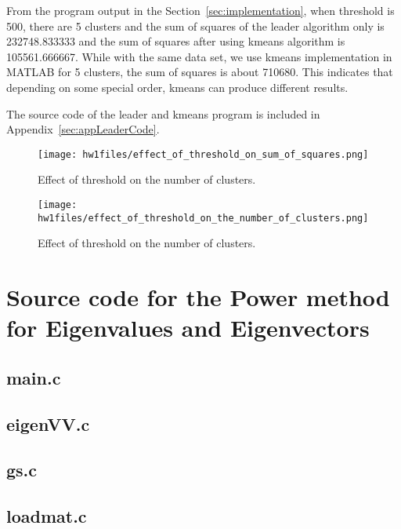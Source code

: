 \documentclass{article}
\begin{document}
From the program output in the Section~\ref{sec:implementation}, when threshold
is 500, there are 5 clusters and the sum of squares of the leader algorithm
only is 232748.833333 and the sum of squares after using kmeans algorithm is
105561.666667. While with the same data set, we use kmeans implementation in
MATLAB for 5 clusters, the sum of squares is about 710680. This indicates that
depending on some special order, kmeans can produce different results.

The source code of the leader and kmeans program is included in
Appendix~\ref{sec:appLeaderCode}.
 
\begin{figure}[ht!]
\centering
\texttt{[image: hw1files/effect\_of\_threshold\_on\_sum\_of\_squares.png]}
\caption{Effect of threshold on the number of clusters.}\label{fig:thresholdSSQ}
\label{fig:thresholdSumSquares}
\end{figure}

\begin{figure}[ht!]
\centering
\texttt{[image: hw1files/effect\_of\_threshold\_on\_the\_number\_of\_clusters.png]}
\caption{Effect of threshold on the number of
clusters.}\label{fig:thresholdClusters}
\end{figure}



\appendix
\section{Source code for the Power method for Eigenvalues and
Eigenvectors}\label{sec:appEigenVVCode}
\subsection{main.c}
\subsection{eigenVV.c}
\subsection{gs.c}
\subsection{loadmat.c}
\end{document}

